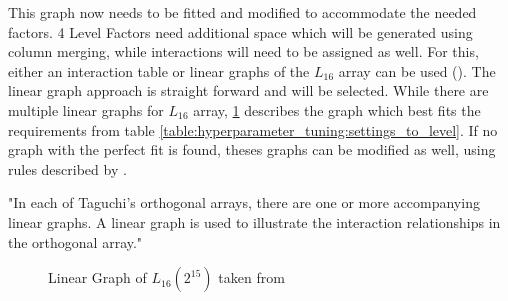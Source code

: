 This graph now needs to be fitted and modified to accommodate the needed factors. 4 Level Factors need additional space which will be generated using column merging, while interactions will need to be assigned as well.
For this, either an interaction table or linear graphs of the $L_{16}$ array can be used (\cite{nazandanacioglu_taguchi_2005}). 
The linear graph approach is straight forward and will be selected. While there are multiple linear graphs for $L_{16}$ array, \ref{figure:hyperparameter_tuning:linear_graph} describes the graph which best fits the requirements from table \ref{table:hyperparameter_tuning:settings_to_level}. If no graph with the perfect fit is found, theses graphs can be modified as well, using rules described by \cite{nazandanacioglu_taguchi_2005}.

"In each of Taguchi’s orthogonal arrays, there are one or more accompanying linear graphs. A linear graph is used to illustrate the interaction relationships in the orthogonal array."\cite{yang_design_2009}

\begin{figure}[H]
	\label{figure:hyperparameter_tuning:linear_graph}
	\centering
{}
\caption{ Linear Graph of $L_{16}(2^{15})$ taken from \cite{yang_design_2009}}
\end{figure}


